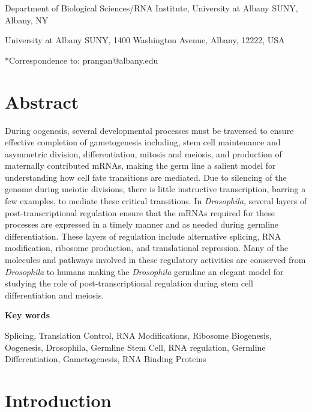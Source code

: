 \documentclass[12pt,twoside]{reedthesis}
\begin{document}
Department of Biological Sciences/RNA Institute, University at Albany
SUNY, Albany, NY

University at Albany SUNY, 1400 Washington Avenue, Albany, 12222, USA

*Correspondence to: prangan@albany.edu

\hypertarget{abstract}{%
\section{Abstract}\label{abstract}}

During oogenesis, several developmental processes must be traversed to
ensure effective completion of gametogenesis including, stem cell
maintenance and asymmetric division, differentiation, mitosis and
meiosis, and production of maternally contributed mRNAs, making the germ
line a salient model for understanding how cell fate transitions are
mediated. Due to silencing of the genome during meiotic divisions, there
is little instructive transcription, barring a few examples, to mediate
these critical transitions. In \emph{Drosophila}, several layers of
post-transcriptional regulation ensure that the mRNAs required for these
processes are expressed in a timely manner and as needed during germline
differentiation. These layers of regulation include alternative
splicing, RNA modification, ribosome production, and translational
repression. Many of the molecules and pathways involved in these
regulatory activities are conserved from \emph{Drosophila} to humans making
the \emph{Drosophila} germline an elegant model for studying the role of
post-transcriptional regulation during stem cell differentiation and
meiosis.

\textbf{Key words}

{Splicing, Translation Control, RNA Modifications, Ribosome Biogenesis,
Oogenesis, Drosophila, Germline Stem Cell, RNA regulation, Germline
Differentiation, Gametogenesis, RNA Binding Proteins}

\hypertarget{introduction-1}{%
\section{Introduction}\label{introduction-1}}
\end{document}
